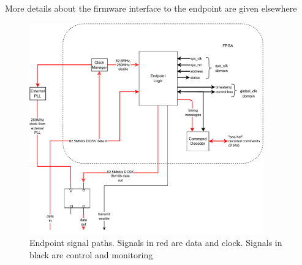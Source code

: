 \documentclass{dune}
\begin{document}
More details about the firmware interface to the endpoint are given elsewhere\cite{ref:dts-endpoint-interface}

\begin{figure}[p]
	\centering
	\includegraphics[width=0.9\textwidth]{dune_timing_endpoint_block_dcsk_drawio.pdf}
	\caption{Endpoint signal paths. Signals in red are data and clock. Signals in black are control and monitoring}
	\label{fig:endpoint_block}
\end{figure}

\clearpage
\printglossary
\printbibliography
\end{document}
